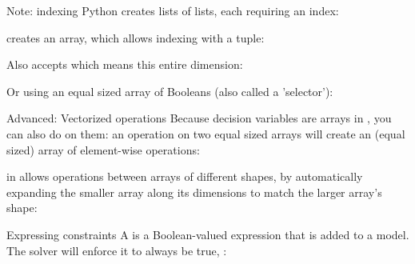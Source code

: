 \documentclass{cons-beamer}
\begin{document}
\begin{flashcardcpmpy}
\begin{frame}{Note: \NumPy indexing}
  Python creates lists of lists, each requiring an index:
  

  \NumPy creates an array, which allows indexing with a tuple:
  

	Also accepts \quoted{:} which means this entire dimension:
  

  Or using an equal sized array of Booleans (also called a 'selector'):
  
\end{frame}

\begin{frame}{Advanced: Vectorized operations}
  Because decision variables are \NumPy arrays in \CPMpy, you can also do  on them: an operation on two equal sized arrays will create an (equal sized) array of element-wise operations:

  \begin{example}
    \vspace{-0.5em}
    
    \vspace{-0.5em}
  \end{example}

   in \NumPy allows operations between arrays of different shapes, by automatically expanding the smaller array along its dimensions to match the larger array's shape: %

  \begin{example}[broadcasting]
    \vspace{-0.5em}
    
    \vspace{-0.5em}
  \end{example}
\end{frame}

\begin{frame}{Expressing constraints}
  A  is a Boolean-valued expression that is added to a model. The solver will enforce it to always be true, \eg:


\end{frame}
\end{flashcardcpmpy}
\end{document}
